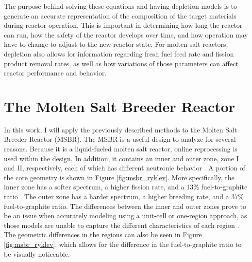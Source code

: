 The purpose behind solving these equations and having depletion models is to generate an accurate representation of the composition of the target materials during reactor operation. This is important in determining how long the reactor can run, how the safety of the reactor develops over time, and how operation may have to change to adjust to the new reactor state. For molten salt reactors, depletion also allows for information regarding fresh fuel feed rate and fission product removal rates, as well as how variations of those parameters can affect reactor performance and behavior.







\section{The Molten Salt Breeder Reactor}

In this work, I will apply the previously described methods to the Molten Salt Breeder Reactor (MSBR). The MSBR is a useful design to analyze for several reasons. Because it is a liquid-fueled molten salt reactor, online reprocessing is used within the design.
In addition, it contains an inner and outer zone, zone I and II, respectively, each of which has different neutronic behavior \cite{robertson_conceptual_1971}.
A portion of the core geometry is shown in Figure \ref{fig:msbr_ryklev}.
More specifically, the inner zone has a softer spectrum, a higher fission rate, and a 13\% fuel-to-graphite ratio \cite{park_whole_2015}.
The outer zone has a harder spectrum, a higher breeding rate, and a 37\% fuel-to-graphite ratio.
The differences between the inner and outer zones prove to be an issue when accurately modeling using a unit-cell or one-region approach, as those models are unable to capture the different characteristics of each region \cite{rykhlevskii_modeling_2019}.
The geometric differences in the regions can also be seen in Figure \ref{fig:msbr_ryklev}, which allows for the difference in the fuel-to-graphite ratio to be visually noticeable.

